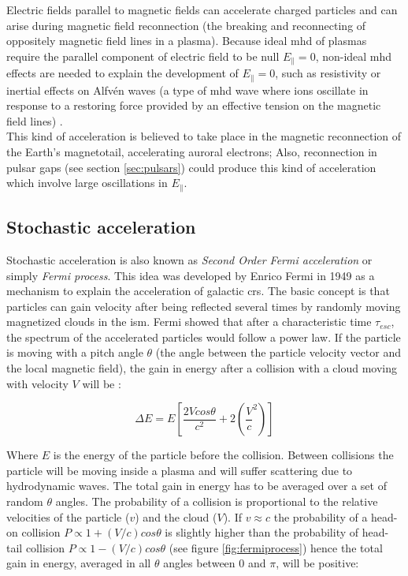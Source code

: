 \documentclass[main.tex]{subfiles}
\begin{document}
Electric fields parallel to magnetic fields can accelerate charged particles and can arise during magnetic field reconnection (the breaking and reconnecting of oppositely magnetic field lines in a plasma). Because ideal \gls{mhd} of plasmas require the parallel component of electric field to be null $E_{\parallel} = 0 $, non-ideal \gls{mhd} effects are needed to explain the development of $E_{\parallel} = 0$, such as resistivity or inertial effects on Alfvén waves (a type of \gls{mhd} wave where ions oscillate in response to a restoring force provided by an effective tension on the magnetic field lines)  \cite{2009accelerationmech}.\\
This kind of acceleration is believed to take place in the magnetic reconnection of the Earth's magnetotail, accelerating auroral electrons; Also, reconnection in pulsar gaps (see section \ref{sec:pulsars}) could produce this kind of acceleration which involve large oscillations in $E_{\parallel}$. 


\subsection{Stochastic acceleration}

Stochastic acceleration is also known as \textit{Second Order Fermi acceleration} or simply \textit{Fermi process}. This idea was developed by Enrico Fermi in 1949 \cite{Fermi:CRorigin} as a mechanism to explain the acceleration of galactic \glspl{cr}. The basic concept is that particles can gain velocity after being reflected several times by randomly moving magnetized clouds in the \gls{ism}. Fermi showed that after a characteristic time $\tau_{esc}$, the spectrum of the accelerated particles would follow a power law. If the particle is moving with a pitch angle $\theta$ (the angle between the particle velocity vector and the local magnetic field), the gain in energy after a collision with a cloud moving with velocity $V$ will be \cite{highenergyastrophy}:

\begin{equation}
    \Delta E = E \left[ \frac{2Vcos\theta}{c^2}+2\left(\frac{V}{c}^2\right)\right]
\end{equation}

Where $E$ is the energy of the particle before the collision. Between collisions the particle will be moving inside a plasma and will suffer scattering due to hydrodynamic waves. The total gain in energy has to be averaged over a set of random $\theta$ angles. The probability of a collision is proportional to the relative velocities of the particle ($v$) and the cloud ($V$). If $v \approx c$ the probability of a head-on collision $P \propto 1+(V/c)cos\theta$ is slightly higher than the probability of head-tail collision $P \propto 1-(V/c)cos\theta$ (see figure \ref{fig:fermiprocess}) hence the total gain in energy, averaged in all $\theta$ angles between 0 and $\pi$, will be positive:
\end{document}
